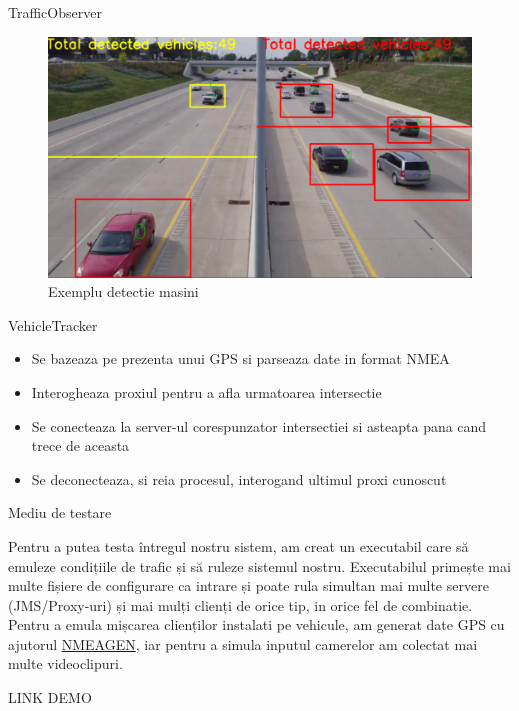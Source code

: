 \documentclass{beamer}
\begin{document}
    \begin{frame}{TrafficObserver}
        \begin{figure}[h!]
            \includegraphics[width=\textwidth ]{TrafficDetectionRunningExample2.png}
            \caption{Exemplu detectie masini }
            \label{fig:Running client samples}
        \end{figure}

        
    \end{frame}

    \begin{frame}{VehicleTracker}

        \begin{itemize}[<+-| alert@+>]
            \item Se bazeaza pe prezenta unui GPS si parseaza date in format NMEA
            \item Interogheaza proxiul pentru a afla urmatoarea intersectie
            \item Se conecteaza la server-ul corespunzator intersectiei si asteapta pana cand trece de aceasta
            \item Se deconecteaza, si reia procesul, interogand ultimul proxi cunoscut
        \end{itemize}

    \end{frame}

    \begin{frame}{Mediu de testare}
        
        Pentru a putea testa întregul nostru sistem, am creat un
        executabil care să emuleze condițiile de trafic și să ruleze
        sistemul nostru. Executabilul primește mai multe fișiere de
        configurare ca intrare și poate rula simultan mai multe servere
        (JMS/Proxy-uri) și mai mulți clienți de orice tip, in orice fel 
        de combinatie. Pentru a emula mișcarea
        clienților instalati pe vehicule, am generat date GPS cu ajutorul
        \href{https://www.nmeagen.org/}{NMEAGEN}, iar pentru a simula
        inputul camerelor am colectat mai multe videoclipuri.

        LINK DEMO
    \end{frame}
\end{document}
